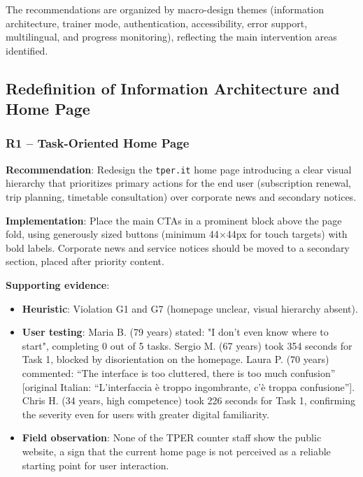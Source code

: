 ﻿\documentclass[11pt,a4paper]{article}
\begin{document}
The recommendations are organized by macro-design themes (information
architecture, trainer mode, authentication, accessibility, error
support, multilingual, and progress monitoring), reflecting the main
intervention areas identified.


\subsection{Redefinition of Information Architecture and Home Page}

\subsubsection{R1 -- Task-Oriented Home Page}
\label{rec:R1}

\textbf{Recommendation}: Redesign the \texttt{tper.it} home page
introducing a clear visual hierarchy that prioritizes primary actions
for the end user (subscription renewal, trip planning,
timetable consultation) over corporate news and secondary notices.

\textbf{Implementation}: Place the main CTAs in a prominent
block above the page fold, using generously sized buttons
(minimum 44$\times$44px for touch targets) with bold labels.
Corporate news and service notices should be moved to
a secondary section, placed after priority content.

\textbf{Supporting evidence}:
\begin{itemize}
    \item \textbf{Heuristic}: Violation G1 and G7 (homepage unclear,
    visual hierarchy absent).
    \item \textbf{User testing}: Maria B. (79 years) stated: "I don't even know where to start", completing 0 out of 5 tasks. Sergio M.
    (67 years) took 354 seconds for Task 1, blocked by
    disorientation on the homepage. Laura P. (70 years) commented:
    ``The interface is too cluttered, there is too much confusion'' [original Italian: ``L'interfaccia \`e troppo ingombrante, c'\`e troppa confusione''].
    Chris H. (34 years, high competence) took 226 seconds for
    Task 1, confirming the severity even for users with greater
    digital familiarity.
    \item \textbf{Field observation}: None of the TPER counter staff show
    the public website, a sign that the current home page is not perceived as
    a reliable starting point for user interaction.
\end{itemize}
\end{document}
